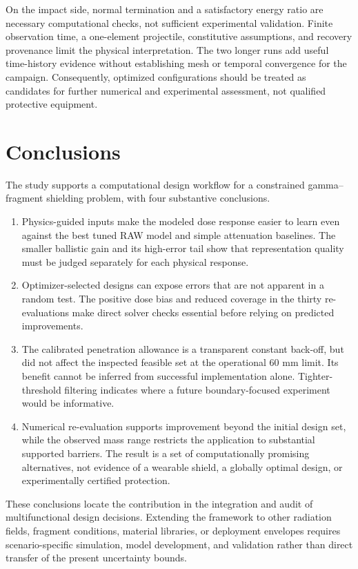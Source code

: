 On the impact side, normal termination and a satisfactory energy ratio are necessary computational checks, not sufficient experimental validation. Finite observation time, a one-element projectile, constitutive assumptions, and recovery provenance limit the physical interpretation. The two longer runs add useful time-history evidence without establishing mesh or temporal convergence for the campaign. Consequently, optimized configurations should be treated as candidates for further numerical and experimental assessment, not qualified protective equipment.

\section{Conclusions}
The study supports a computational design workflow for a constrained gamma--fragment shielding problem, with four substantive conclusions.
\begin{enumerate}
\item Physics-guided inputs make the modeled dose response easier to learn even against the best tuned RAW model and simple attenuation baselines. The smaller ballistic gain and its high-error tail show that representation quality must be judged separately for each physical response.
\item Optimizer-selected designs can expose errors that are not apparent in a random test. The positive dose bias and reduced coverage in the thirty re-evaluations make direct solver checks essential before relying on predicted improvements.
\item The calibrated penetration allowance is a transparent constant back-off, but did not affect the inspected feasible set at the operational 60 mm limit. Its benefit cannot be inferred from successful implementation alone. Tighter-threshold filtering indicates where a future boundary-focused experiment would be informative.
\item Numerical re-evaluation supports improvement beyond the initial design set, while the observed mass range restricts the application to substantial supported barriers. The result is a set of computationally promising alternatives, not evidence of a wearable shield, a globally optimal design, or experimentally certified protection.
\end{enumerate}
These conclusions locate the contribution in the integration and audit of multifunctional design decisions. Extending the framework to other radiation fields, fragment conditions, material libraries, or deployment envelopes requires scenario-specific simulation, model development, and validation rather than direct transfer of the present uncertainty bounds.

